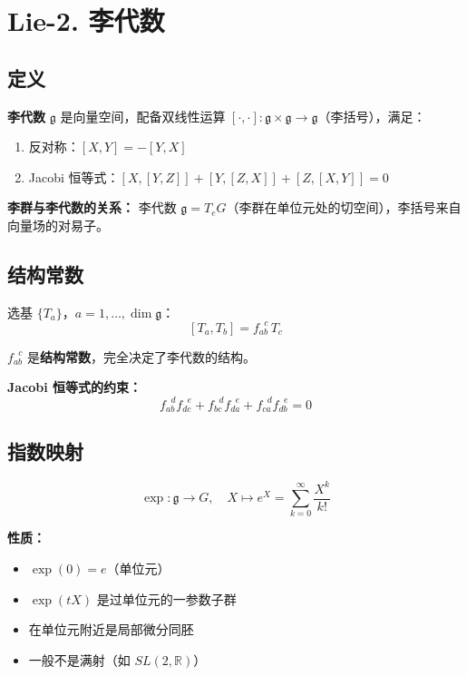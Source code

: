 \section{Lie-2. 李代数}
\label{sec:lie-algebra}

\subsection{定义}

\textbf{李代数} $\mathfrak{g}$ 是向量空间，配备双线性运算 $[\cdot,\cdot]: \mathfrak{g} \times \mathfrak{g} \to \mathfrak{g}$（李括号），满足：
\begin{enumerate}
  \item 反对称：$[X, Y] = -[Y, X]$
  \item Jacobi 恒等式：$[X, [Y, Z]] + [Y, [Z, X]] + [Z, [X, Y]] = 0$
\end{enumerate}

\textbf{李群与李代数的关系：} 李代数 $\mathfrak{g} = T_e G$（李群在单位元处的切空间），李括号来自向量场的对易子。

\subsection{结构常数}

选基 $\{T_a\}$，$a = 1, \ldots, \dim\mathfrak{g}$：
\[
[T_a, T_b] = f_{ab}^{\;\;c}\, T_c
\]

$f_{ab}^{\;\;c}$ 是\textbf{结构常数}，完全决定了李代数的结构。

\textbf{Jacobi 恒等式的约束：}
\[
f_{ab}^{\;\;d}f_{dc}^{\;\;e} + f_{bc}^{\;\;d}f_{da}^{\;\;e} + f_{ca}^{\;\;d}f_{db}^{\;\;e} = 0
\]

\subsection{指数映射}

\[
\exp: \mathfrak{g} \to G, \quad X \mapsto e^X = \sum_{k=0}^{\infty} \frac{X^k}{k!}
\]

\textbf{性质：}
\begin{itemize}
  \item $\exp(0) = e$（单位元）
  \item $\exp(tX)$ 是过单位元的一参数子群
  \item 在单位元附近是局部微分同胚
  \item 一般不是满射（如 $SL(2,\mathbb{R})$）
\end{itemize}

